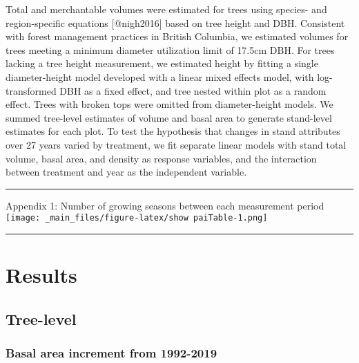 \documentclass[
]{article}
\begin{document}
Total and merchantable volumes were estimated for trees using species- and region-specific equations {[}@nigh2016{]} based on tree height and DBH. Consistent with forest management practices in British Columbia, we estimated volumes for trees meeting a minimum diameter utilization limit of 17.5cm DBH. For trees lacking a tree height measurement, we estimated height by fitting a single diameter-height model developed with a linear mixed effects model, with log-transformed DBH as a fixed effect, and tree nested within plot as a random effect. Trees with broken tops were omitted from diameter-height models. We summed tree-level estimates of volume and basal area to generate stand-level estimates for each plot. To test the hypothesis that changes in stand attributes over 27 years varied by treatment, we fit separate linear models with stand total volume, basal area, and density as response variables, and the interaction between treatment and year as the independent variable.

\begin{center}\rule{0.5\linewidth}{0.5pt}\end{center}

Appendix 1: Number of growing seasons between each measurement period
\texttt{[image: \_main\_files/figure-latex/show paiTable-1.png]}

\begin{center}\rule{0.5\linewidth}{0.5pt}\end{center}

\hypertarget{results}{%
\section{Results}\label{results}}

\hypertarget{tree-level}{%
\subsection{Tree-level}\label{tree-level}}

\hypertarget{basal-area-increment-from-1992-2019}{%
\subsubsection{Basal area increment from 1992-2019}\label{basal-area-increment-from-1992-2019}}
\end{document}

